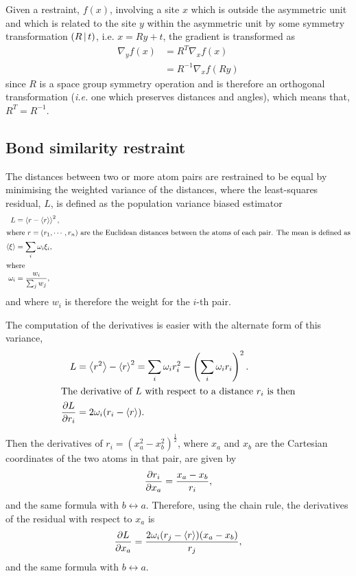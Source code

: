 \documentclass[pdf]{iucr}
\begin{document}
Given a restraint, $f(x)$, involving a site $x$ which is outside the asymmetric unit and which is related to the site $y$ within the asymmetric unit by some symmetry transformation $\left( R\,\vert\, t \right)$, i.e. $x=Ry+t$, the gradient is transformed as
\begin{align}
\nabla_y f\left(x \right)  &= R^T \nabla_x f\left(x\right) \nonumber\\
&= R^{-1} \nabla_x f\left(R y\right)
\end{align}
since $R$ is a space group symmetry operation and is therefore an orthogonal transformation (\emph{i.e.} one which preserves distances and angles), which means that, $R^T = R^{-1}$.

\subsection{Bond similarity restraint}

The distances between two or more atom pairs are restrained to be equal by minimising the weighted variance of the distances, where the least-squares residual, $L$, is defined as the population variance biased estimator
\begin{align}
\label{eqn:bond_similarity}
L &= \left\langle r - \left\langle r \right\rangle \right\rangle^2,\\
\intertext{where $r=(r_1, \cdots, r_n)$ are the Euclidean distances between the atoms of each pair. The mean is defined as}
\left\langle \xi \right\rangle &= \sum_i \omega_i \xi_i, \\
\intertext{where}
\omega_i &= \frac{w_i}{\sum_j w_j},
\end{align}
and where $w_i$ is therefore the weight for the $i$-th pair.

The computation of the derivatives is easier with the alternate form of this variance, 
\begin{align}
L &= \left\langle r^2 \right\rangle - \left\langle r \right\rangle^2 = \sum_i \omega_i r_i^2 - \left(\sum_i \omega_i r_i\right)^2.\\
\intertext{The derivative of $L$ with respect to a distance $r_i$ is then}
\frac{\partial L}{\partial r_i} &= 2 \omega_i(r_i - \left\langle r \right\rangle).
\end{align}

Then the derivatives of $r_i = (x_a^2 - x_b^2)^\frac{1}{2}$, where $x_a$ and $x_b$ are the Cartesian coordinates of the two atoms in that pair, are given by
\begin{equation}
\frac{\partial r_i}{\partial x_a} = \frac{x_a - x_b}{r_i},
\end{equation}
and the same formula with $b \leftrightarrow a$.
Therefore, using the chain rule, the derivatives of the residual with respect to $x_a$ is
\begin{equation}
\frac{\partial L}{\partial x_a} = \frac{2 \omega_i (r_j - \left\langle r \right\rangle)(x_a - x_b)}{r_j},
\end{equation}
and the same formula with $b \leftrightarrow a$.
\end{document}
